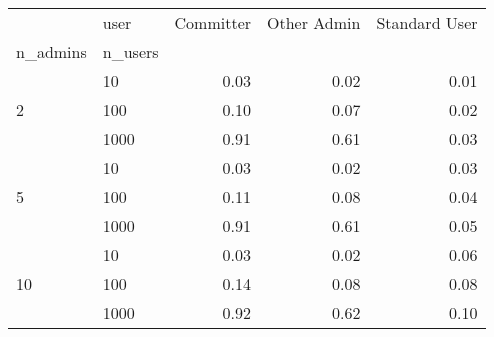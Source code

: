 \begin{tabular}{llrrr}
\toprule
 & user & Committer & Other Admin & Standard User \\
n_admins & n_users &  &  &  \\
\midrule
\multirow[t]{3}{*}{2} & 10 & 0.03 & 0.02 & 0.01 \\
 & 100 & 0.10 & 0.07 & 0.02 \\
 & 1000 & 0.91 & 0.61 & 0.03 \\
\cline{1-5}
\multirow[t]{3}{*}{5} & 10 & 0.03 & 0.02 & 0.03 \\
 & 100 & 0.11 & 0.08 & 0.04 \\
 & 1000 & 0.91 & 0.61 & 0.05 \\
\cline{1-5}
\multirow[t]{3}{*}{10} & 10 & 0.03 & 0.02 & 0.06 \\
 & 100 & 0.14 & 0.08 & 0.08 \\
 & 1000 & 0.92 & 0.62 & 0.10 \\
\cline{1-5}
\bottomrule
\end{tabular}
